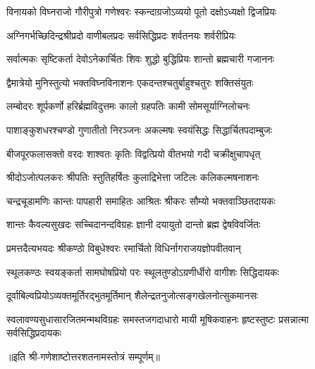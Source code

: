 
\twolineshloka
{विनायको विघ्नराजो गौरीपुत्रो गणेश्वरः}
{स्कन्दाग्रजोऽव्ययो पूतो दक्षोऽध्यक्षो द्विजप्रियः}

\twolineshloka
{अग्निगर्भच्छिदिन्द्रश्रीप्रदो वाणीबलप्रदः}
{सर्वसिद्धिप्रदः शर्वतनयः शर्वरीप्रियः}

\twolineshloka
{सर्वात्मकः सृष्टिकर्ता देवोऽनेकार्चितः शिवः}
{शुद्धो बुद्धिप्रियः शान्तो ब्रह्मचारी गजाननः}

\twolineshloka
{द्वैमात्रेयो मुनिस्तुत्यो भक्तविघ्नविनाशनः}
{एकदन्तश्चतुर्बाहुश्चतुरः शक्तिसंयुतः}

\twolineshloka
{लम्बोदरः शूर्पकर्णो हरिर्ब्रह्मविदुत्तमः}
{कालो ग्रहपतिः कामी सोमसूर्याग्निलोचनः}

\twolineshloka
{पाशाङ्कुशधरश्चण्डो गुणातीतो निरञ्जनः}
{अकल्मषः स्वयंसिद्धः सिद्धार्चितपदाम्बुजः}

\twolineshloka
{बीजपूरफलासक्तो वरदः शाश्वतः कृतिः}
{विद्वत्प्रियो वीतभयो गदी चक्रीक्षुचापधृत्}

\twolineshloka
{श्रीदोऽजोत्पलकरः श्रीपतिः स्तुतिहर्षितः}
{कुलाद्रिभेत्ता जटिलः कलिकल्मषनाशनः}

\twolineshloka
{चन्द्रचूडामणिः कान्तः पापहारी समाहितः}
{आश्रितः श्रीकरः सौम्यो भक्तवाञ्छितदायकः}

\twolineshloka
{शान्तः कैवल्यसुखदः सच्चिदानन्दविग्रहः}
{ज्ञानी दयायुतो दान्तो ब्रह्म द्वेषविवर्जितः}

\twolineshloka
{प्रमत्तदैत्यभयदः श्रीकण्ठो विबुधेश्वरः}
{रमार्चितो विधिर्नागराजयज्ञोपवीतवान्}

\twolineshloka
{स्थूलकण्ठः स्वयङ्कर्ता सामघोषप्रियो परः}
{स्थूलतुण्डोऽग्रणीर्धीरो वागीशः सिद्धिदायकः}

\twolineshloka
{दूर्वाबिल्वप्रियोऽव्यक्तमूर्तिरद्भुतमूर्तिमान्}
{शैलेन्द्रतनुजोत्सङ्गखेलनोत्सुकमानसः}

\threelineshloka
{स्वलावण्यसुधासारजितमन्मथविग्रहः}
{समस्तजगदाधारो मायी मूषिकवाहनः}
{हृष्टस्तुष्टः प्रसन्नात्मा सर्वसिद्धिप्रदायकः}

{॥इति श्री-गणेशाष्टोत्तरशतनामस्तोत्रं सम्पूर्णम्॥}
